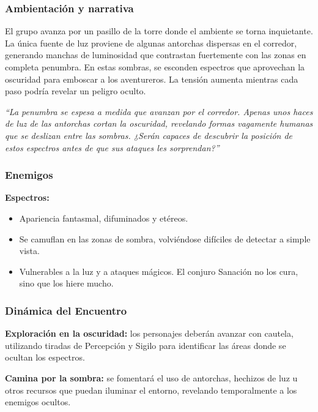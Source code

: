 \documentclass[
  twocolumn]{article}
\providecommand{\tightlist}{%
  \setlength{\itemsep}{0pt}\setlength{\parskip}{0pt}}
\begin{document}
\subsubsection{Ambientación y
narrativa}\label{ambientaciuxf3n-y-narrativa-2}

El grupo avanza por un pasillo de la torre donde el ambiente se torna
inquietante. La única fuente de luz proviene de algunas antorchas
dispersas en el corredor, generando manchas de luminosidad que
contrastan fuertemente con las zonas en completa penumbra. En estas
sombras, se esconden espectros que aprovechan la oscuridad para emboscar
a los aventureros. La tensión aumenta mientras cada paso podría revelar
un peligro oculto.

\emph{``La penumbra se espesa a medida que avanzan por el corredor.
Apenas unos haces de luz de las antorchas cortan la oscuridad, revelando
formas vagamente humanas que se deslizan entre las sombras. ¿Serán
capaces de descubrir la posición de estos espectros antes de que sus
ataques les sorprendan?''}

\subsubsection{Enemigos}\label{enemigos-1}

\textbf{Espectros:}

\begin{itemize}
\tightlist
\item
  Apariencia fantasmal, difuminados y etéreos.
\item
  Se camuflan en las zonas de sombra, volviéndose difíciles de detectar
  a simple vista.
\item
  Vulnerables a la luz y a ataques mágicos. El conjuro Sanación no los
  cura, sino que los hiere mucho.
\end{itemize}

\subsubsection{Dinámica del
Encuentro}\label{dinuxe1mica-del-encuentro-2}

\textbf{Exploración en la oscuridad:} los personajes deberán avanzar con
cautela, utilizando tiradas de Percepción y Sigilo para identificar las
áreas donde se ocultan los espectros.

\textbf{Camina por la sombra:} se fomentará el uso de antorchas,
hechizos de luz u otros recursos que puedan iluminar el entorno,
revelando temporalmente a los enemigos ocultos.
\end{document}
